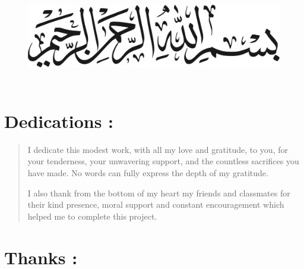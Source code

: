 \documentclass[12pt,a4paper]{report}
\begin{document}
\begin{figure}[H]
\centering
\includegraphics[width=6.6277in,height=1.65729in]{media/image3.png}
\end{figure}
\clearpage



\section{Dedications :}
\begin{quote}
I dedicate this modest work, with all my love and gratitude, to you, for
your tenderness, your unwavering support, and the countless sacrifices
you have made. No words can fully express the depth of my gratitude.

I also thank from the bottom of my heart my friends and classmates for
their kind presence, moral support and constant encouragement which
helped me to complete this project.
\end{quote}
\clearpage


\section{Thanks :}
\end{document}
